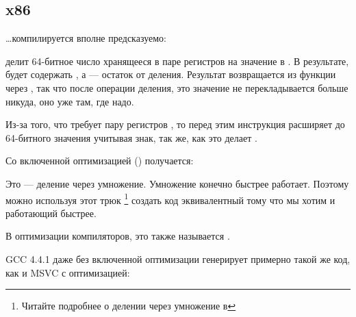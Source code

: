 ﻿\subsection{x86}

\dots компилируется вполне предсказуемо:



\IDIV делит 64-битное число хранящееся в паре регистров  на значение в \ECX. 
В результате, \EAX будет содержать , а \EDX --- остаток от деления. 
Результат возвращается из функции через \EAX, так что после операции деления, 
это значение не перекладывается больше никуда, 
оно уже там, где надо.

Из-за того, что \IDIV требует пару регистров , то перед этим инструкция  
расширяет \EAX до 64-битного значения учитывая знак, так же, как это делает \MOVSX.

Со включенной оптимизацией (\Ox) получается:



Это --- деление через умножение. Умножение конечно быстрее работает. 
Поэтому можно используя этот трюк
\footnote{Читайте подробнее о делении через умножение в }
создать код эквивалентный тому что мы хотим и работающий быстрее.

В оптимизации компиляторов, это также называется 
.

GCC 4.4.1 даже без включенной оптимизации генерирует примерно такой же код, 
как и MSVC с оптимизацией:


